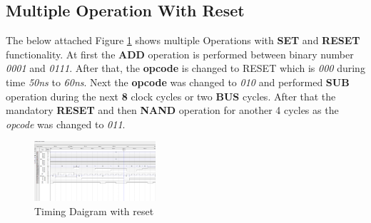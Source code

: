 \subsection{Multiple Operation With Reset}\label{subsec:multiple-operation-with-reset}
The below attached Figure \ref{fig:multiple operation} shows multiple Operations with \textbf{SET} and \textbf{RESET} functionality.
At first the \textbf{ADD} operation is performed between binary number \textit{0001} and \textit{0111}.
After that, the \textbf{opcode} is changed to RESET which is \textit{000} during time \textit{50ns} to \textit{60ns}.
Next the \textbf{opcode} was changed to \textit{010} and performed \textbf{SUB} operation during the next \textbf{8} clock cycles or two \textbf{BUS} cycles.
After that the mandatory \textbf{RESET} and then \textbf{NAND} operation for another 4 cycles as the \textit{opcode} was changed to \textit{011}.
\begin{figure}[H]
    \begin{center}
        \includegraphics[width = 0.4\textwidth]{figures/Multiple_Operations}
    \end{center}
    \caption{Timing Daigram with reset}
    \label{fig:multiple operation}
\end{figure}
